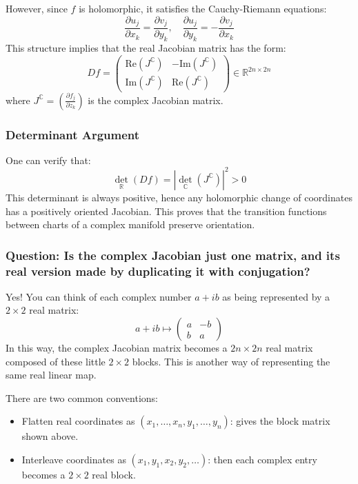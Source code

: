 However, since \(f\) is holomorphic, it satisfies the Cauchy-Riemann equations:
\[
\frac{\partial u_j}{\partial x_k} = \frac{\partial v_j}{\partial y_k}, \quad
\frac{\partial u_j}{\partial y_k} = -\frac{\partial v_j}{\partial x_k}
\]
This structure implies that the real Jacobian matrix has the form:
\[
Df = 
\begin{pmatrix}
\mathrm{Re}(J^{\mathbb{C}}) & -\mathrm{Im}(J^{\mathbb{C}}) \\
\mathrm{Im}(J^{\mathbb{C}}) & \mathrm{Re}(J^{\mathbb{C}})
\end{pmatrix}
\in \mathbb{R}^{2n \times 2n}
\]
where \( J^{\mathbb{C}} = \left( \frac{\partial f_j}{\partial z_k} \right) \) is the complex Jacobian matrix.

\subsubsection*{Determinant Argument}

One can verify that:
\[
\det_{\mathbb{R}}(Df) = \left| \det_{\mathbb{C}}(J^{\mathbb{C}}) \right|^2 > 0
\]
This determinant is always positive, hence any holomorphic change of coordinates has a positively oriented Jacobian. This proves that the transition functions between charts of a complex manifold preserve orientation.

\subsubsection*{Question: Is the complex Jacobian just one matrix, and its real version made by duplicating it with conjugation?}

Yes! You can think of each complex number \( a + ib \) as being represented by a \(2 \times 2\) real matrix:
\[
a + ib \mapsto \begin{pmatrix}
a & -b \\
b & a
\end{pmatrix}
\]
In this way, the complex Jacobian matrix becomes a \(2n \times 2n\) real matrix composed of these little \(2 \times 2\) blocks. This is another way of representing the same real linear map.

There are two common conventions:
\begin{itemize}
    \item Flatten real coordinates as \( (x_1, \dots, x_n, y_1, \dots, y_n) \): gives the block matrix shown above.
    \item Interleave coordinates as \( (x_1, y_1, x_2, y_2, \dots) \): then each complex entry becomes a \(2 \times 2\) real block.
\end{itemize}

